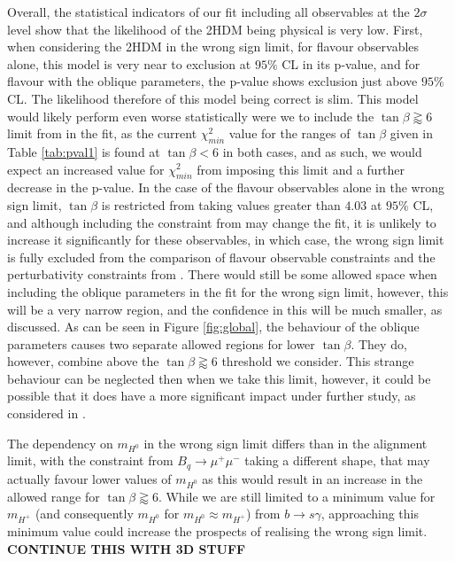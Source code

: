 \documentclass[a4paper,12pt]{article}
\begin{document}
Overall, the statistical indicators of our fit including all observables at the $2\sigma$ level show that the likelihood of the 2HDM being physical is very low. 
First, when considering the 2HDM in the wrong sign limit, for flavour observables alone, this model is very near to exclusion at $95\%$ CL in its p-value, and for flavour with the oblique parameters, the p-value shows exclusion just above $95\%$ CL. 
The likelihood therefore of this model being correct is slim. 
This model would likely perform even worse statistically were we to include the $\tan\beta\gtrapprox6$ limit from \cite{oliver} in the fit, as the current $\chi^2_{min}$ value for the ranges of $\tan\beta$ given in Table \ref{tab:pval1} is found at $\tan\beta<6$ in both cases, and as such, we would expect an increased value for $\chi^2_{min}$ from imposing this limit and a further decrease in the p-value. 
In the case of the flavour observables alone in the wrong sign limit, $\tan\beta$ is restricted from taking values greater than $4.03$ at $95\%$ CL, and although including the constraint from \cite{oliver} may change the fit, it is unlikely to increase it significantly for these observables, in which case, the wrong sign limit is fully excluded from the comparison of flavour observable constraints and the perturbativity constraints from \cite{oliver}.
There would still be some allowed space when including the oblique parameters in the fit for the wrong sign limit, however, this will be a very narrow region, and the confidence in this will be much smaller, as discussed.
As can be seen in Figure \ref{fig:global}, the behaviour of the oblique parameters causes two separate allowed regions for lower $\tan\beta$. 
They do, however, combine above the $\tan\beta\gtrapprox6$ threshold we consider. 
This strange behaviour can be neglected then when we take this limit, however, it could be possible that it does have a more significant impact under further study, as considered in \cite{james}.

The dependency on $m_{H^0}$ in the wrong sign limit differs than in the alignment limit, with the constraint from $B_q\to\mu^+\mu^-$ taking a different shape, that may actually favour lower values of $m_{H^0}$ as this would result in an increase in the allowed range for $\tan\beta\gtrapprox6$.
While we are still limited to a minimum value for $m_{H^+}$ (and consequently $m_{H^0}$ for $m_{H^0}\approx m_{H^+}$) from $b\to s\gamma$, approaching this minimum value could increase the prospects of realising the wrong sign limit. 
\textbf{CONTINUE THIS WITH 3D STUFF}
\end{document}

